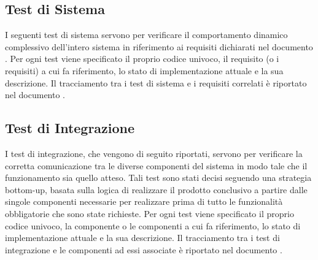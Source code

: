 \documentclass[a4paper, titlepage]{article}
\begin{document}


\newpage
\subsection{Test di Sistema}
I seguenti test di sistema servono per verificare il comportamento dinamico complessivo dell'intero sistema in riferimento ai requisiti dichiarati nel documento .
\newline Per ogni test viene specificato il proprio codice univoco, il requisito (o i requisiti) a cui fa riferimento, lo stato di implementazione attuale e la sua descrizione.
\newline Il tracciamento tra i test di sistema e i requisiti correlati è riportato nel documento .



\newpage
\subsection{Test di Integrazione}
I test di integrazione, che vengono di seguito riportati, servono per verificare la corretta comunicazione tra le diverse componenti del sistema  in modo tale che il funzionamento sia quello atteso.
\newline Tali test sono stati decisi seguendo una strategia bottom-up, basata sulla logica di realizzare il prodotto conclusivo a partire dalle singole componenti necessarie per realizzare  prima di tutto le funzionalità obbligatorie che sono state richieste.
\newline Per ogni test viene specificato il proprio codice univoco, la componente o le componenti a cui fa riferimento, lo stato di implementazione attuale e la sua descrizione. 
\newline Il tracciamento tra i test di integrazione e le componenti ad essi associate è riportato nel documento .
\end{document}
